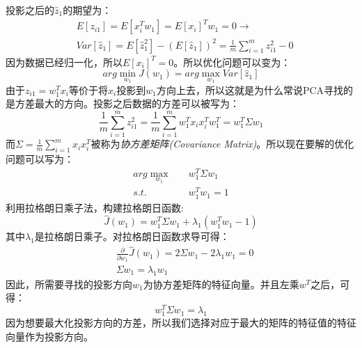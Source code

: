 \documentclass[UTF8, 12pt]{ctexart}
\begin{document}
投影之后的$\hat{z}_{1}$的期望为：
\begin{align}
	& E[z_{i1}] = E[x_{i}^{T}w_{1}] = E[x_{i}]^{T}w_{1} = 0 \to \\
	& Var[\hat{z}_{1}] = E[\hat{z}_{1}^{2}] - (E[\hat{z}_{1}])^2 = \frac{1}{m} \sum_{i=1}^{m} z_{i1}^{2} - 0
\end{align}
因为数据已经归一化，所以$E[x_{i}]^{T} = 0$。所以优化问题可以变为：
\begin{equation}
	arg \min_{w_{1}} J(w_{1}) = arg \max_{w_{1}} Var[\hat{z}_{1}]
\end{equation}
由于$z_{i1} = w^{T}_{1}x_{i}$等价于将$x_{i}$投影到$w_{1}$方向上去，所以这就是为什么常说PCA寻找的是方差最大的方向。投影之后数据的方差可以被写为：
\begin{equation}
	\frac{1}{m} \sum_{i=1}^{m} z_{i1}^{2} = \frac{1}{m} \sum_{i=1}^{m} w_{1}^{T}x_{i}x_{i}^{T}w_{1}^{T} = w_{1}^{T}\Sigma w_{1}
\end{equation}
而$\Sigma = \frac{1}{m} \sum_{i=1}^{m} x_{i}x_{i}^{T}$被称为\emph{协方差矩阵(Covariance Matrix)}。所以现在要解的优化问题可以写为：
\begin{align}
	arg \max_{w_{1}} & \quad w_{1}^{T}\Sigma w_{1} \\
	s.t. & \quad w_{1}^{T}w_{1} = 1
\end{align}
利用拉格朗日乘子法，构建拉格朗日函数:
\begin{equation}
	\hat{J}(w_{1}) = w_{1}^{T}\Sigma w_{1} + \lambda_{1}(w_{1}^{T}w_{1} - 1)
\end{equation}
其中$\lambda_{1}$是拉格朗日乘子。对拉格朗日函数求导可得：
\begin{align}
	& \frac{\partial}{\partial w_{1}} \hat{J}(w_1) = 2\Sigma w_{1} - 2\lambda_{1}w_{1} = 0 \\ 
	& \Sigma w_{1} = \lambda_{1}w_{1}
\end{align}
因此，所需要寻找的投影方向$w_{1}$为协方差矩阵的特征向量。并且左乘$w^{T}$之后，可得：
\begin{equation}
	w_{1}^{T}\Sigma w_{1} = \lambda_{1}
\end{equation}
因为想要最大化投影方向的方差，所以我们选择对应于最大的矩阵的特征值的特征向量作为投影方向。
\end{document}
